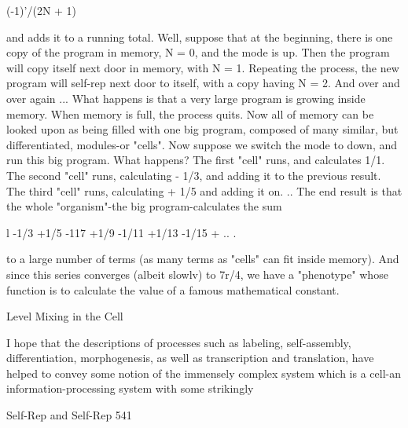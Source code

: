 {                                         (-1)'/(2N + 1)

and adds it to a running total.
         Well, suppose that at the beginning, there is one copy of the program in memory, N =
0, and the mode is up. Then the program will copy itself next door in memory, with N = 1.
Repeating the process, the new program will self-rep next door to itself, with a copy having
N = 2. And over and over again ... What happens is that a very large program is growing
inside memory. When memory is full, the process quits. Now all of memory can be looked
upon as being filled with one big program, composed of many similar, but differentiated,
modules-or "cells". Now suppose we switch the mode to down, and run this big program.
What happens? The first "cell" runs, and calculates 1/1. The second "cell" runs, calculating -
1/3, and adding it to the previous result. The third "cell" runs, calculating + 1/5 and adding it
on. .. The end result is that the whole "organism"-the big program-calculates the sum

                         l -1/3 +1/5 -117 +1/9 -1/11 +1/13 -1/15 + .. .

to a large number of terms (as many terms as "cells" can fit inside memory). And since this
series converges (albeit slowlv) to 7r/4, we have a "phenotype" whose function is to calculate
the value of a famous mathematical constant.

                                   Level Mixing in the Cell

I hope that the descriptions of processes such as labeling, self-assembly, differentiation,
morphogenesis, as well as transcription and translation, have helped to convey some notion
of the immensely complex system which is a cell-an information-processing system with
some strikingly




Self-Rep and Self-Rep                                                                        541

}
